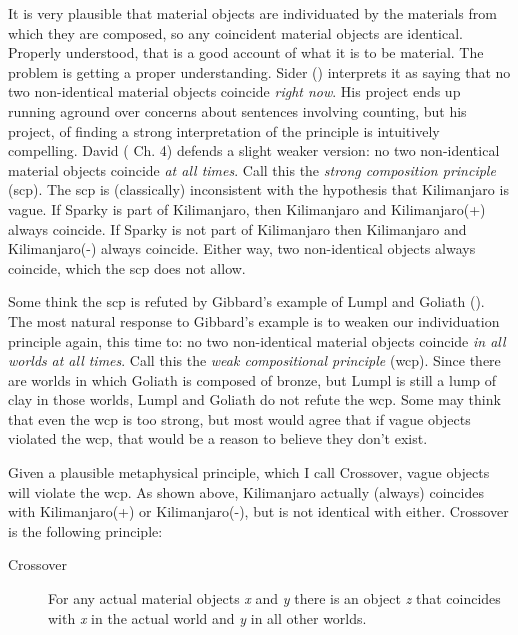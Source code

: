 \documentclass[
  11pt,
  letterpaper,
  DIV=11,
  numbers=noendperiod,
  oneside]{scrartcl}
\begin{document}
It is very plausible that material objects are individuated by the
materials from which they are composed, so any coincident material
objects are identical. Properly understood, that is a good account of
what it is to be material. The problem is getting a proper
understanding. Sider () interprets
it as saying that no two non-identical material objects coincide
\emph{right now}. His project ends up running aground over concerns
about sentences involving counting, but his project, of finding a strong
interpretation of the principle is intuitively compelling. David
( Ch. 4) defends a slight weaker
version: no two non-identical material objects coincide \emph{at all
times}. Call this the \emph{strong composition principle} (scp). The scp
is (classically) inconsistent with the hypothesis that Kilimanjaro is
vague. If Sparky is part of Kilimanjaro, then Kilimanjaro and
Kilimanjaro(+) always coincide. If Sparky is not part of Kilimanjaro
then Kilimanjaro and Kilimanjaro(-) always coincide. Either way, two
non-identical objects always coincide, which the scp does not allow.

Some think the scp is refuted by Gibbard's example of Lumpl and Goliath
(). The most natural response to
Gibbard's example is to weaken our individuation principle again, this
time to: no two non-identical material objects coincide \emph{in all
worlds} \emph{at all times}. Call this the \emph{weak compositional
principle} (wcp). Since there are worlds in which Goliath is composed of
bronze, but Lumpl is still a lump of clay in those worlds, Lumpl and
Goliath do not refute the wcp. Some may think that even the wcp is too
strong, but most would agree that if vague objects violated the wcp,
that would be a reason to believe they don't exist.

Given a plausible metaphysical principle, which I call Crossover, vague
objects will violate the wcp. As shown above, Kilimanjaro actually
(always) coincides with Kilimanjaro(+) or Kilimanjaro(-), but is not
identical with either. Crossover is the following principle:

\begin{description}
\item[Crossover]
For any actual material objects \emph{x} and \emph{y} there is an object
\emph{z} that coincides with \emph{x} in the actual world and \emph{y}
in all other worlds.
\end{description}
\end{document}
